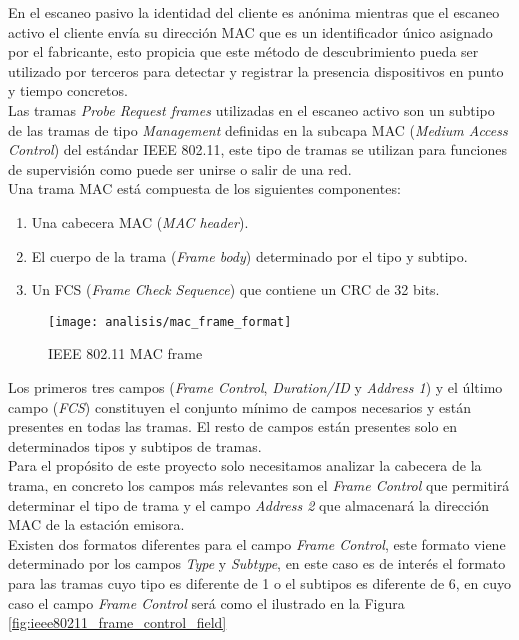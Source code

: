 \documentclass[../proyecto.tex]{subfiles}
\begin{document}
En el escaneo pasivo la identidad del cliente es anónima mientras que el escaneo activo el cliente envía su dirección MAC que es un identificador único asignado por el fabricante, esto propicia que este método de descubrimiento pueda ser utilizado por terceros para detectar y registrar la presencia dispositivos en punto y tiempo concretos.\\

Las tramas \textit{Probe Request frames} utilizadas en el escaneo activo son un subtipo de las tramas de tipo \textit{Management} definidas en la subcapa MAC (\textit{Medium Access Control}) del estándar IEEE 802.11, este tipo de tramas se utilizan para funciones de supervisión como puede ser unirse o salir de una red.\\

Una trama MAC está compuesta de los siguientes componentes:
\begin{enumerate}
  \item Una cabecera MAC (\textit{MAC header}).
  \item El cuerpo de la trama (\textit{Frame body}) determinado por el tipo y subtipo.
  \item Un FCS (\textit{Frame Check Sequence}) que contiene un CRC de 32 bits.
\end{enumerate}

\begin{figure}[H]
\centering
\texttt{[image: analisis/mac\_frame\_format]}
\caption{IEEE 802.11 MAC frame}
\label{fig:ieee80211_mac_frame}
\end{figure}

Los primeros tres campos (\textit{Frame Control}, \textit{Duration/ID} y \textit{Address 1}) y el último campo (\textit{FCS}) constituyen el conjunto mínimo de campos necesarios y están presentes en todas las tramas. El resto de campos están presentes solo en determinados tipos y subtipos de tramas.\\

Para el propósito de este proyecto solo necesitamos analizar la cabecera de la trama, en concreto los campos más relevantes son el \textit{Frame Control} que permitirá determinar el tipo de trama y el campo \textit{Address 2} que almacenará la dirección MAC de la estación emisora.\\

Existen dos formatos diferentes para el campo \textit{Frame Control}, este formato viene determinado por los campos \textit{Type} y \textit{Subtype}, en este caso es de interés el formato para las tramas cuyo tipo es diferente de 1 o el subtipos es diferente de 6, en cuyo caso el campo \textit{Frame Control} será como el ilustrado en la Figura \ref{fig:ieee80211_frame_control_field}
\end{document}
